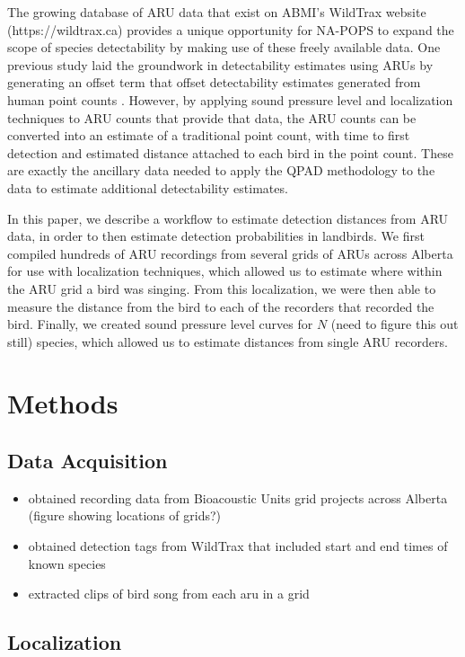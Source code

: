 \documentclass[12pt]{article}
\begin{document}
The growing database of ARU data that exist on ABMI’s WildTrax website (https://wildtrax.ca) provides a unique opportunity for NA-POPS to expand the scope of species detectability by making use of these freely available data. One previous study laid the groundwork in detectability estimates using ARUs by generating an offset term that offset detectability estimates generated from human point counts \citep{van_wilgenburg_paired_2017}. However, by applying sound pressure level and localization techniques to ARU counts that provide that data, the ARU counts can be converted into an estimate of a traditional point count, with time to first detection and estimated distance attached to each bird in the point count. These are exactly the ancillary data needed to apply the QPAD methodology to the data to estimate additional detectability estimates. 

In this paper, we describe a workflow to estimate detection distances from ARU data, in order to then estimate detection probabilities in landbirds. We first compiled hundreds of ARU recordings from several grids of ARUs across Alberta for use with localization techniques, which allowed us to estimate where within the ARU grid a bird was singing. From this localization, we were then able to measure the distance from the bird to each of the recorders that recorded the bird. Finally, we created sound pressure level curves for $N$ (need to figure this out still) species, which allowed us to estimate distances from single ARU recorders.

\section{Methods}
\subsection{Data Acquisition}

\begin{itemize}
	\item obtained recording data from Bioacoustic Units grid projects across Alberta (figure showing locations of grids?)
	\item obtained detection tags from WildTrax that included start and end times of known species
	\item extracted clips of bird song from each aru in a grid
\end{itemize}

\subsection{Localization}
\end{document}
